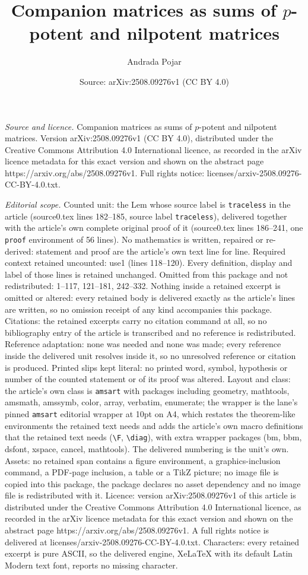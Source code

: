 \documentclass[10pt,a4paper]{amsart}
\title[Companion matrices as sums of $p$-potent and nilpotent matri]{Companion matrices as sums of $p$-potent and nilpotent matrices}
\author{Andrada Pojar}
\date{Source: arXiv:2508.09276v1 (CC BY 4.0)}
\begin{document}
\maketitle

\noindent\emph{Source and licence.} Companion matrices as sums of $p$-potent and nilpotent matrices. Version arXiv:2508.09276v1 (CC BY 4.0), distributed under the Creative Commons Attribution 4.0 International licence, as recorded in the arXiv licence metadata for this exact version and shown on the abstract page https://arxiv.org/abs/2508.09276v1. Full rights notice: licenses/arxiv-2508.09276-CC-BY-4.0.txt.\par\smallskip

\noindent\textit{Editorial scope.} Counted unit: the Lem whose source label is \texttt{traceless} in the article (source0.tex lines 182--185, source label \texttt{traceless}), delivered together with the article's own complete original proof of it (source0.tex lines 186--241, one \texttt{proof} environment of 56 lines). No mathematics is written, repaired or re-derived: statement and proof are the article's own text line for line. Required context retained uncounted: use1 (lines 118--120). Every definition, display and label of those lines is retained unchanged. Omitted from this package and not redistributed: 1--117, 121--181, 242--332. Nothing inside a retained excerpt is omitted or altered: every retained body is delivered exactly as the article's lines are written, so no omission receipt of any kind accompanies this package. Citations: the retained excerpts carry no citation command at all, so no bibliography entry of the article is transcribed and no reference is redistributed. Reference adaptation: none was needed and none was made; every reference inside the delivered unit resolves inside it, so no unresolved reference or citation is produced. Printed slips kept literal: no printed word, symbol, hypothesis or number of the counted statement or of its proof was altered. Layout and class: the article's own class is \texttt{amsart} with packages including geometry, mathtools, amsmath, amssymb, color, array, verbatim, enumerate; the wrapper is the lane's pinned \texttt{amsart} editorial wrapper at 10pt on A4, which restates the theorem-like environments the retained text needs and adds the article's own macro definitions that the retained text needs (\texttt{\textbackslash F}, \texttt{\textbackslash diag}), with extra wrapper packages (bm, bbm, dsfont, xspace, cancel, mathtools). The delivered numbering is the unit's own. Assets: no retained span contains a figure environment, a graphics-inclusion command, a PDF-page inclusion, a table or a TikZ picture; no image file is copied into this package, the package declares no asset dependency and no image file is redistributed with it. Licence: version arXiv:2508.09276v1 of this article is distributed under the Creative Commons Attribution 4.0 International licence, as recorded in the arXiv licence metadata for this exact version and shown on the abstract page https://arxiv.org/abs/2508.09276v1. A full rights notice is delivered at licenses/arxiv-2508.09276-CC-BY-4.0.txt. Characters: every retained excerpt is pure ASCII, so the delivered engine, XeLaTeX with its default Latin Modern text font, reports no missing character.
\end{document}
